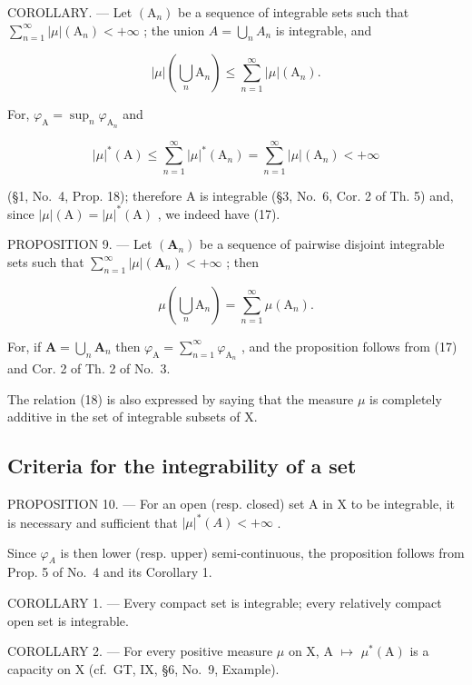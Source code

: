 COROLLARY. --- Let \((\mathrm{A}_{n})\) be a sequence of integrable sets such that \(\sum_{n=1}^{\infty} |\mu|(\mathrm{A}_{n}) < +\infty\) ; the union \(A = \bigcup_{n} A_{n}\) is integrable, and

\[
| \mu | \left(\bigcup_ {n} \mathrm{A} _ {n}\right) \leqslant \sum_ {n = 1} ^ {\infty} | \mu | (\mathrm{A} _ {n}).\tag{17}
\]

For, \(\varphi_{\mathrm{A}} = \sup_n\varphi_{\mathrm{A}_n}\) and

\[
| \mu | ^ {*} (\mathrm{A}) \leqslant \sum_ {n = 1} ^ {\infty} | \mu | ^ {*} (\mathrm{A} _ {n}) = \sum_ {n = 1} ^ {\infty} | \mu | (\mathrm{A} _ {n}) <   + \infty
\]

(§1, No.~4, Prop. 18); therefore A is integrable (§3, No.~6, Cor. 2 of Th. 5) and, since \(|\mu|(\mathrm{A}) = |\mu|^*(\mathrm{A})\) , we indeed have (17).

PROPOSITION 9. --- Let \((\mathbf{A}_{n})\) be a sequence of pairwise disjoint integrable sets such that \(\sum_{n=1}^{\infty}|\mu|(\mathbf{A}_{n})<+\infty\) ; then

\[
\mu \left(\bigcup_ {n} \mathrm{A} _ {n}\right) = \sum_ {n = 1} ^ {\infty} \mu (\mathrm{A} _ {n}).\tag{18}
\]

For, if \(\mathbf{A} = \bigcup_{n}\mathbf{A}_{n}\) then \(\varphi_{\mathrm{A}} = \sum_{n = 1}^{\infty}\varphi_{\mathrm{A}_n}\) , and the proposition follows from (17) and Cor. 2 of Th. 2 of No.~3.

The relation (18) is also expressed by saying that the measure \(\mu\) is completely additive in the set of integrable subsets of X.

\subsection{Criteria for the integrability of a set}

PROPOSITION 10. --- For an open (resp. closed) set A in X to be integrable, it is necessary and sufficient that \(|\mu|^{*}(A)<+\infty\) .

Since \(\varphi_{A}\) is then lower (resp. upper) semi-continuous, the proposition follows from Prop. 5 of No.~4 and its Corollary 1.

COROLLARY 1. --- Every compact set is integrable; every relatively compact open set is integrable.

COROLLARY 2. --- For every positive measure \(\mu\) on X, A \(\mapsto\) \(\mu^{*}(\mathrm{A})\) is a capacity on X (cf.~GT, IX, §6, No.~9, Example).

